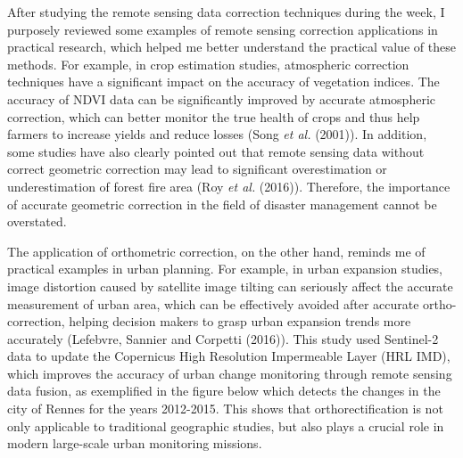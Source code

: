 \documentclass[
  letterpaper,
  DIV=11,
  numbers=noendperiod]{scrreprt}
\begin{document}
After studying the remote sensing data correction techniques during the
week, I purposely reviewed some examples of remote sensing correction
applications in practical research, which helped me better understand
the practical value of these methods. For example, in crop estimation
studies, atmospheric correction techniques have a significant impact on
the accuracy of vegetation indices. The accuracy of NDVI data can be
significantly improved by accurate atmospheric correction, which can
better monitor the true health of crops and thus help farmers to
increase yields and reduce losses (Song \emph{et al.} (2001)). In
addition, some studies have also clearly pointed out that remote sensing
data without correct geometric correction may lead to significant
overestimation or underestimation of forest fire area (Roy \emph{et al.}
(2016)). Therefore, the importance of accurate geometric correction in
the field of disaster management cannot be overstated.

The application of orthometric correction, on the other hand, reminds me
of practical examples in urban planning. For example, in urban expansion
studies, image distortion caused by satellite image tilting can
seriously affect the accurate measurement of urban area, which can be
effectively avoided after accurate ortho-correction, helping decision
makers to grasp urban expansion trends more accurately (Lefebvre,
Sannier and Corpetti (2016)). This study used Sentinel-2 data to update
the Copernicus High Resolution Impermeable Layer (HRL IMD), which
improves the accuracy of urban change monitoring through remote sensing
data fusion, as exemplified in the figure below which detects the
changes in the city of Rennes for the years 2012-2015. This shows that
orthorectification is not only applicable to traditional geographic
studies, but also plays a crucial role in modern large-scale urban
monitoring missions.
\end{document}
